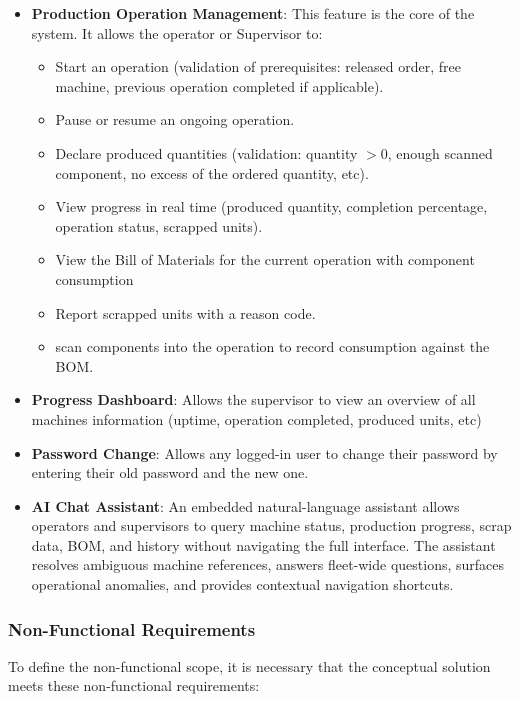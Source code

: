 \begin{itemize}
	\item \textbf{Production Operation Management}: This feature is the core of the
	      system. It allows the operator or Supervisor to:
	      \begin{itemize}
	      	\item Start an operation (validation of prerequisites: released order, free machine, previous operation completed if applicable).
	      	\item Pause or resume an ongoing operation.
		 	\item Declare produced quantities (validation: quantity $> 0$, enough scanned component, no excess of the ordered quantity, etc).
	      	\item View progress in real time (produced quantity, completion percentage, operation status, scrapped units).
			\item View the Bill of Materials for the current operation with component consumption
	      	\item Report scrapped units with a reason code.
	      	\item scan components into the operation to record consumption against the BOM.
	      \end{itemize}

	\item \textbf{Progress Dashboard}: Allows the supervisor to view an overview of all machines information 
	 (uptime, operation completed, produced units, etc)

	\item \textbf{Password Change}: Allows any logged-in user to change their password
	      by entering their old password and the new one.

	\item \textbf{AI Chat Assistant}: An embedded natural-language assistant allows
	      operators and supervisors to query machine status, production progress, scrap
	      data, BOM, and history without navigating the full interface. The assistant
	      resolves ambiguous machine references, answers fleet-wide questions, surfaces
	      operational anomalies, and provides contextual navigation shortcuts.
\end{itemize}

\subsubsection*{Non-Functional Requirements}

To define the non-functional scope, it is necessary that the conceptual solution meets
these non-functional requirements:


